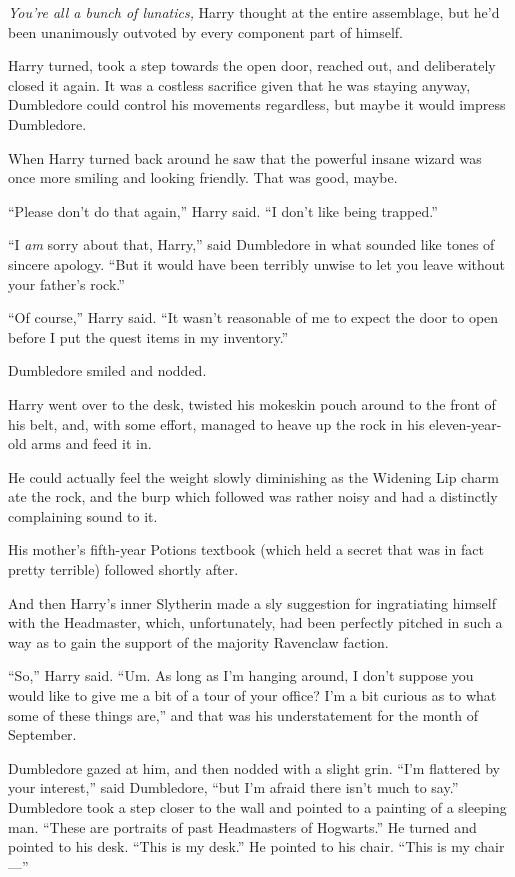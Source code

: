 \emph{You’re all a bunch of lunatics,} Harry thought at the entire assemblage, but he’d been unanimously outvoted by every component part of himself.

Harry turned, took a step towards the open door, reached out, and deliberately closed it again. It was a costless sacrifice given that he was staying anyway, Dumbledore could control his movements regardless, but maybe it would impress Dumbledore.

When Harry turned back around he saw that the powerful insane wizard was once more smiling and looking friendly. That was good, maybe.

“Please don’t do that again,” Harry said. “I don’t like being trapped.”

“I \emph{am} sorry about that, Harry,” said Dumbledore in what sounded like tones of sincere apology. “But it would have been terribly unwise to let you leave without your father’s rock.”

“Of course,” Harry said. “It wasn’t reasonable of me to expect the door to open before I put the quest items in my inventory.”

Dumbledore smiled and nodded.

Harry went over to the desk, twisted his mokeskin pouch around to the front of his belt, and, with some effort, managed to heave up the rock in his eleven-year-old arms and feed it in.

He could actually feel the weight slowly diminishing as the Widening Lip charm ate the rock, and the burp which followed was rather noisy and had a distinctly complaining sound to it.

His mother’s fifth-year Potions textbook (which held a secret that was in fact pretty terrible) followed shortly after.

And then Harry’s inner Slytherin made a sly suggestion for ingratiating himself with the Headmaster, which, unfortunately, had been perfectly pitched in such a way as to gain the support of the majority Ravenclaw faction.

“So,” Harry said. “Um. As long as I’m hanging around, I don’t suppose you would like to give me a bit of a tour of your office? I’m a bit curious as to what some of these things are,” and that was his understatement for the month of September.

Dumbledore gazed at him, and then nodded with a slight grin. “I’m flattered by your interest,” said Dumbledore, “but I’m afraid there isn’t much to say.” Dumbledore took a step closer to the wall and pointed to a painting of a sleeping man. “These are portraits of past Headmasters of Hogwarts.” He turned and pointed to his desk. “This is my desk.” He pointed to his chair. “This is my chair—”

